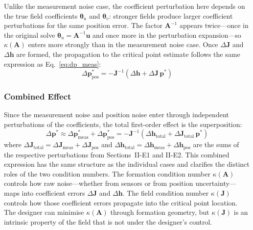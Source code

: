 \documentclass[lettersize,journal]{IEEEtran}
\begin{document}
Unlike the measurement noise case, the coefficient perturbation here depends on the true field coefficients $\boldsymbol{\theta}_u$ and $\boldsymbol{\theta}_v$: stronger fields produce larger coefficient perturbations for the same position error. The factor $\mathbf{A}^{-1}$ appears twice---once in the original solve $\boldsymbol{\theta}_u = \mathbf{A}^{-1}\mathbf{u}$ and once more in the perturbation expansion---so $\kappa(\mathbf{A})$ enters more strongly than in the measurement noise case. Once $\Delta\mathbf{J}$ and $\Delta\mathbf{h}$ are formed, the propagation to the critical point estimate follows the same expression as Eq.~\eqref{eq:dp_meas}:
\begin{equation}
    \Delta\mathbf{p}^*_{\text{pos}} = -\mathbf{J}^{-1}\!\left(\Delta\mathbf{h} + \Delta\mathbf{J}\,\mathbf{p}^*\right)
    \label{eq:dp_pos}
\end{equation}

\subsubsection{Combined Effect}

Since the measurement noise and position noise enter through independent perturbations of the coefficients, the total first-order effect is the superposition:
\begin{equation}
    \Delta\mathbf{p}^* \approx \Delta\mathbf{p}^*_{\text{meas}} + \Delta\mathbf{p}^*_{\text{pos}} = -\mathbf{J}^{-1}\!\left(\Delta\mathbf{h}_{\text{total}} + \Delta\mathbf{J}_{\text{total}}\,\mathbf{p}^*\right)
    \label{eq:dp_combined}
\end{equation}
where $\Delta\mathbf{J}_{\text{total}} = \Delta\mathbf{J}_{\text{meas}} + \Delta\mathbf{J}_{\text{pos}}$ and $\Delta\mathbf{h}_{\text{total}} = \Delta\mathbf{h}_{\text{meas}} + \Delta\mathbf{h}_{\text{pos}}$ are the sums of the respective perturbations from Sections~II-E1 and II-E2. This combined expression has the same structure as the individual cases and clarifies the distinct roles of the two condition numbers. The formation condition number $\kappa(\mathbf{A})$ controls how raw noise---whether from sensors or from position uncertainty---maps into coefficient errors $\Delta\mathbf{J}$ and $\Delta\mathbf{h}$. The field condition number $\kappa(\mathbf{J})$ controls how those coefficient errors propagate into the critical point location. The designer can minimise $\kappa(\mathbf{A})$ through formation geometry, but $\kappa(\mathbf{J})$ is an intrinsic property of the field that is not under the designer's control.
\end{document}
